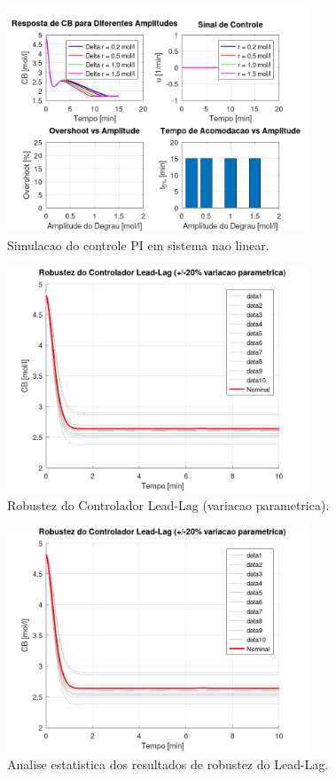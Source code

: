 \documentclass[a4paper,12pt]{article}
\begin{document}
\begin{figure}[H]
    \centering
    \includegraphics[width=0.8\textwidth]{figura_pi_naolinear_amplitudes.png}
    \caption{Simulacao do controle PI em sistema nao linear.}
    \label{fig:pi_naolinear_amplitudes}
\end{figure}

\begin{figure}[H]
    \centering
    \includegraphics[width=0.8\textwidth]{figura_robustez_leadlag_curvas.png}
    \caption{Robustez do Controlador Lead-Lag (variacao parametrica).}
    \label{fig:robustez_leadlag_curvas}
\end{figure}

\begin{figure}[H]
    \centering
    \includegraphics[width=0.8\textwidth]{figura_robustez_leadlag_curvas.png}
    \caption{Analise estatistica dos resultados de robustez do Lead-Lag.}
    \label{fig:robustez_leadlag_distribuicao}
\end{figure}
\end{document}
